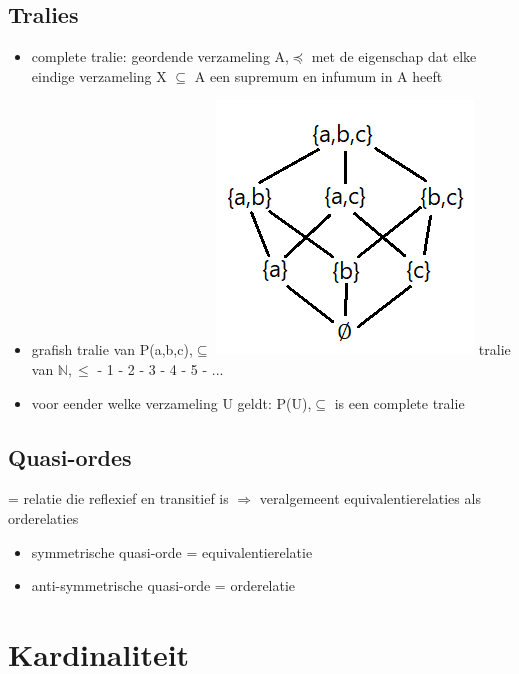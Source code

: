 \documentclass{article}
\begin{document}
\subsection{Tralies}
\begin{itemize}
    \item complete tralie: geordende verzameling A,$\preceq$ met de eigenschap dat elke eindige verzameling X $\subseteq$ A een supremum en infumum in A heeft
    \item grafish \newline tralie van P({a,b,c}),$\subseteq$ \newline \includegraphics{tralie} \newline
    tralie van $\mathbb{N} ,\leq$
    \newline {} - 1 - 2 - 3 - 4 - 5 - ...
    \item voor eender welke verzameling U geldt: P(U),$\subseteq$ is een complete tralie
\end{itemize}
\subsection{Quasi-ordes}
= relatie die reflexief en transitief is
$\Rightarrow$ veralgemeent equivalentierelaties als orderelaties
\begin{itemize}
    \item symmetrische quasi-orde = equivalentierelatie
    \item anti-symmetrische quasi-orde = orderelatie
\end{itemize}

\section{Kardinaliteit}
\end{document}
